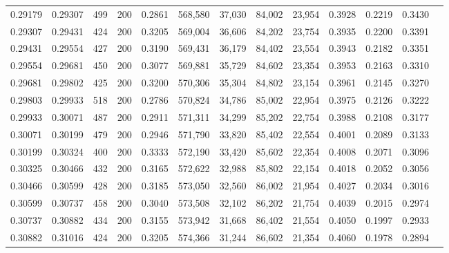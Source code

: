 \begin{tabular}{rrrrrrrrrrrrr}
0.29179 & 0.29307 &   499 & 200 &                                     0.2861 & 568,580 &  37,030 &  84,002 &  23,954 & 0.3928 & 0.2219 & 0.3430 \\
0.29307 & 0.29431 &   424 & 200 &                                     0.3205 & 569,004 &  36,606 &  84,202 &  23,754 & 0.3935 & 0.2200 & 0.3391 \\
0.29431 & 0.29554 &   427 & 200 &                                     0.3190 & 569,431 &  36,179 &  84,402 &  23,554 & 0.3943 & 0.2182 & 0.3351 \\
0.29554 & 0.29681 &   450 & 200 &                                     0.3077 & 569,881 &  35,729 &  84,602 &  23,354 & 0.3953 & 0.2163 & 0.3310 \\
0.29681 & 0.29802 &   425 & 200 &                                     0.3200 & 570,306 &  35,304 &  84,802 &  23,154 & 0.3961 & 0.2145 & 0.3270 \\
0.29803 & 0.29933 &   518 & 200 &                                     0.2786 & 570,824 &  34,786 &  85,002 &  22,954 & 0.3975 & 0.2126 & 0.3222 \\
0.29933 & 0.30071 &   487 & 200 &                                     0.2911 & 571,311 &  34,299 &  85,202 &  22,754 & 0.3988 & 0.2108 & 0.3177 \\
0.30071 & 0.30199 &   479 & 200 &                                     0.2946 & 571,790 &  33,820 &  85,402 &  22,554 & 0.4001 & 0.2089 & 0.3133 \\
0.30199 & 0.30324 &   400 & 200 &                                     0.3333 & 572,190 &  33,420 &  85,602 &  22,354 & 0.4008 & 0.2071 & 0.3096 \\
0.30325 & 0.30466 &   432 & 200 &                                     0.3165 & 572,622 &  32,988 &  85,802 &  22,154 & 0.4018 & 0.2052 & 0.3056 \\
0.30466 & 0.30599 &   428 & 200 &                                     0.3185 & 573,050 &  32,560 &  86,002 &  21,954 & 0.4027 & 0.2034 & 0.3016 \\
0.30599 & 0.30737 &   458 & 200 &                                     0.3040 & 573,508 &  32,102 &  86,202 &  21,754 & 0.4039 & 0.2015 & 0.2974 \\
0.30737 & 0.30882 &   434 & 200 &                                     0.3155 & 573,942 &  31,668 &  86,402 &  21,554 & 0.4050 & 0.1997 & 0.2933 \\
0.30882 & 0.31016 &   424 & 200 &                                     0.3205 & 574,366 &  31,244 &  86,602 &  21,354 & 0.4060 & 0.1978 & 0.2894 \\

\end{tabular}
